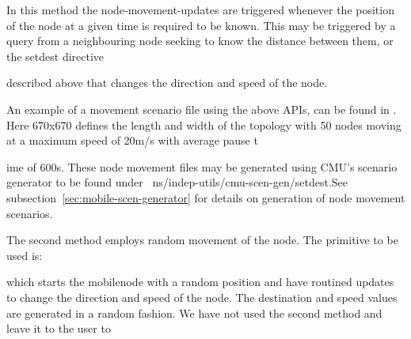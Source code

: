 In this method the node-movement-updates are triggered whenever the position of the node at a given time is required to be known. This may be triggered by a query from a neighbouring node seeking to know the distance between them, or the setdest directive





















 described above that changes the direction and speed of the node.

An example of a movement scenario file using the above APIs, can be found in . Here 670x670 defines the length and width of the topology with 50 nodes moving at a maximum speed of 20m/s with average pause t





















ime of 600s. These node movement files may be generated using CMU's scenario generator to be found under ~ns/indep-utils/cmu-scen-gen/setdest.See subsection~\ref{sec:mobile-scen-generator} for details on generation of node movement scenarios.

The second method employs random movement of the node. The primitive to be used is:

which starts the mobilenode with a random position and have routined updates to change the direction and speed of the node. The destination and speed values are generated in a random fashion. We have not used the second method and leave it to the user to 





















